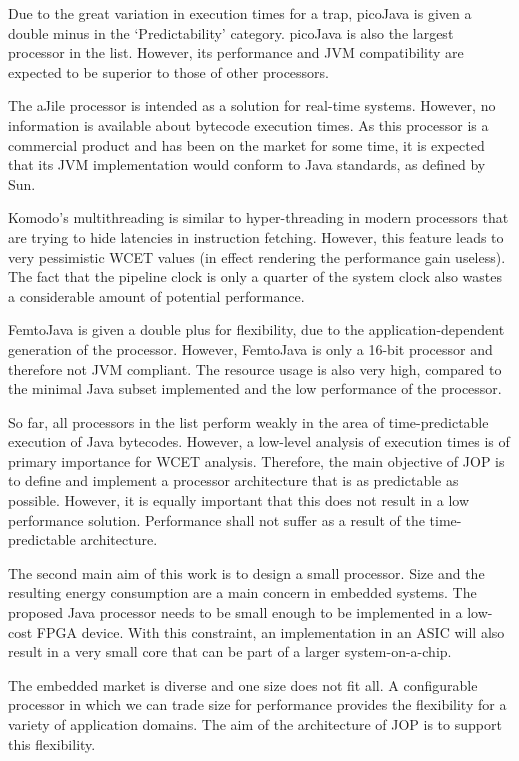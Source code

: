 Due to the great variation in execution times for a trap, picoJava
is given a double minus in the `Predictability' category. picoJava
is also the largest processor in the list. However, its performance
and JVM compatibility are expected to be superior to those of other
processors.

The aJile processor is intended as a solution for real-time systems.
However, no information is available about bytecode execution times.
As this processor is a commercial product and has been on the market
for some time, it is expected that its JVM implementation would
conform to Java standards, as defined by Sun.

Komodo's multithreading is similar to hyper-threading in modern
processors that are trying to hide latencies in instruction fetching.
However, this feature leads to very pessimistic WCET values (in
effect rendering the performance gain useless). The fact that the
pipeline clock is only a quarter of the system clock also wastes a
considerable amount of potential performance.

FemtoJava is given a double plus for flexibility, due to the
application-dependent generation of the processor. However,
FemtoJava is only a 16-bit processor and therefore not JVM
compliant. The resource usage is also very high, compared to the
minimal Java subset implemented and the low performance of the
processor.

So far, all processors in the list perform weakly in the area of
time-predictable execution of Java bytecodes. However, a low-level
analysis of execution times is of primary importance for WCET
analysis. Therefore, the main objective of JOP is to define and
implement a processor architecture that is as predictable as
possible. However, it is equally important that this does not result
in a low performance solution. Performance shall not suffer as a
result of the time-predictable architecture.

The second main aim of this work is to design a small processor.
Size and the resulting energy consumption are a main concern in
embedded systems. The proposed Java processor needs to be small
enough to be implemented in a low-cost FPGA device. With this
constraint, an implementation in an ASIC will also result in a very
small core that can be part of a larger system-on-a-chip.

The embedded market is diverse and one size does not fit all. A
configurable processor in which we can trade size for performance
provides the flexibility for a variety of application domains. The
aim of the architecture of JOP is to support this flexibility.

